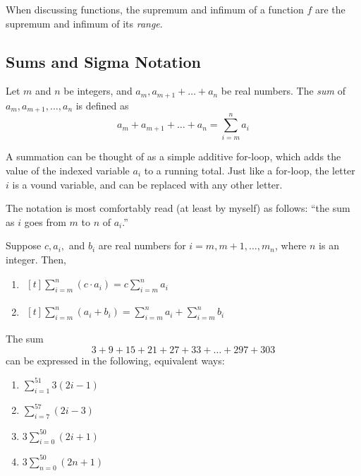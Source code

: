 \documentclass{article}
\begin{document}
      When discussing functions, the supremum and infimum of a function \(f\) are the supremum and infimum of its \emph{range}.

      \subsection{Sums and Sigma Notation}
      \begin{defi}
        Let \(m\) and \(n\) be integers, and \(a_m, a_{m+1} + \ldots + a_n\) be real numbers. The \emph{sum} of \(a_m, a_{m+1}, \ldots, a_n\) is defined as 
        \[
          a_m + a_{m+1} + \ldots + a_n = \sum_{i = m}^{n}{a_i}
        \]

      \end{defi}

      A summation can be thought of as a simple additive for-loop, which adds the value of the indexed variable \(a_i\) to a running total. Just like a for-loop, the letter \(i\) is a vound variable, and can be replaced with any other letter.
      
      The notation is most comfortably read (at least by myself) as follows: ``the sum as \(i\) goes from \(m\) to \(n\) of \(a_i\).''

      \begin{prop}
        Suppose \(c, a_i,\) and \(b_i\) are real numbers for \(i = m, m+1, \ldots, m_n\), where \(n\) is an integer. Then,
        \begin{enumerate}
          \item \(\begin{aligned}[t]
                    \sum_{i = m}^{n}{(c \cdot a_i)} = c \sum_{i = m}^{n}{a_i}
                 \end{aligned}\)
          \item \(\begin{aligned}[t]
                    \sum_{i = m}^{n}{(a_i + b_i)} = \sum_{i = m}^{n}{a_i} + \sum_{i = m}^{n}{b_i}
                  \end{aligned}\)
      \end{enumerate}
      \end{prop}

      \begin{eg}
        The sum 
        \[
          3 + 9 + 15 + 21 + 27 + 33 + \ldots  + 297 + 303
        \]
        can be expressed in the following, equivalent ways:

        \begin{enumerate}
          \item \(\sum_{i = 1}^{51}{3(2i - 1)}\)
          \item \(\sum_{i = 7}^{57}{(2i - 3)}\)
          \item \(3\sum_{i = 0}^{50}{(2i+1)}\)
          \item \(3\sum_{n = 0}^{50}{(2n+1)}\)
        \end{enumerate}
      \end{eg}
\end{document}
